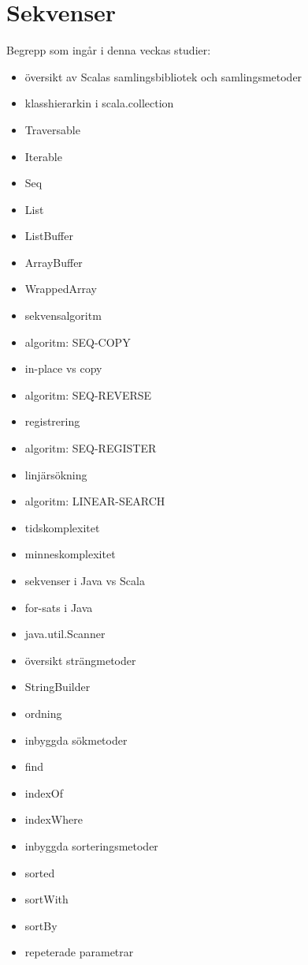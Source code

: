 \chapter{Sekvenser}\label{chapter:W06}
Begrepp som ingår i denna veckas studier:
\begin{multicols}{2}\begin{itemize}[noitemsep,label={$\square$},leftmargin=*]
\item översikt av Scalas samlingsbibliotek och samlingsmetoder
\item klasshierarkin i scala.collection
\item Traversable
\item Iterable
\item Seq
\item List
\item ListBuffer
\item ArrayBuffer
\item WrappedArray
\item sekvensalgoritm
\item algoritm: SEQ-COPY
\item in-place vs copy
\item algoritm: SEQ-REVERSE
\item registrering
\item algoritm: SEQ-REGISTER
\item linjärsökning
\item algoritm: LINEAR-SEARCH
\item tidskomplexitet
\item minneskomplexitet
\item sekvenser i Java vs Scala
\item for-sats i Java
\item java.util.Scanner
\item översikt strängmetoder
\item StringBuilder
\item ordning
\item inbyggda sökmetoder
\item find
\item indexOf
\item indexWhere
\item inbyggda sorteringsmetoder
\item sorted
\item sortWith
\item sortBy
\item repeterade parametrar\end{itemize}\end{multicols}
